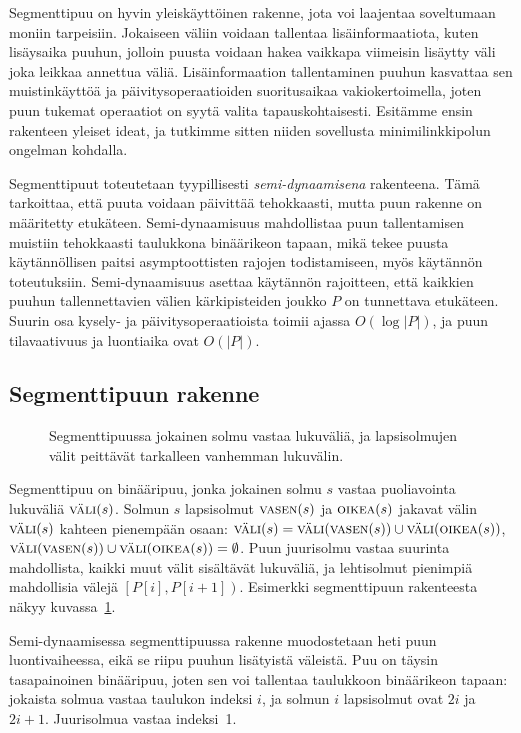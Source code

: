 \documentclass[finnish]{tktltiki2}
\theoremstyle{definition}
\theoremstyle{remark}
\newcommand\range[2]{\ensuremath{\left [ #1 , #2 \right )}\xspace}
\newcommand\size[1]{\ensuremath{\left |#1\right |}\xspace}
\newcommand\epts{\ensuremath{P}\xspace}
\newcommand\inter[1]{\ensuremath{\textsc{väli}(#1)}\xspace}
\newcommand\leftc[1]{\ensuremath{\textsc{vasen}(#1)}\xspace}
\newcommand\rightc[1]{\ensuremath{\textsc{oikea}(#1)}\xspace}
\begin{document}
Segmenttipuu on hyvin yleiskäyttöinen rakenne, jota voi laajentaa soveltumaan moniin tarpeisiin.
Jokaiseen väliin voidaan tallentaa lisäinformaatiota, kuten lisäysaika puuhun, jolloin puusta voidaan hakea vaikkapa viimeisin lisäytty väli joka leikkaa annettua väliä.
Lisäinformaation tallentaminen puuhun kasvattaa sen muistinkäyttöä ja päivitysoperaatioiden suoritusaikaa vakiokertoimella, joten puun tukemat operaatiot on syytä valita tapauskohtaisesti.
Esitämme ensin rakenteen yleiset ideat, ja tutkimme sitten niiden sovellusta minimilinkkipolun ongelman kohdalla.

Segmenttipuut toteutetaan tyypillisesti \emph{semi-dynaamisena} rakenteena.
Tämä tarkoittaa, että puuta voidaan päivittää tehokkaasti, mutta puun rakenne on määritetty etukäteen.
Semi-dynaamisuus mahdollistaa puun tallentamisen muistiin tehokkaasti taulukkona binäärikeon tapaan, mikä tekee puusta käytännöllisen paitsi asymptoottisten rajojen todistamiseen, myös käytännön toteutuksiin.
Semi-dynaamisuus asettaa käytännön rajoitteen, että kaikkien puuhun tallennettavien välien kärkipisteiden joukko \epts on tunnettava etukäteen.
Suurin osa kysely- ja päivitysoperaatioista toimii ajassa $O(\log \size{\epts})$, ja puun tilavaativuus ja luontiaika ovat $O(\size{\epts})$.

\subsection{Segmenttipuun rakenne}

\begin{figure}
\caption{Segmenttipuussa jokainen solmu vastaa lukuväliä, ja lapsisolmujen välit peittävät tarkalleen vanhemman lukuvälin.}\label{segpuu}
\end{figure}

Segmenttipuu on binääripuu, jonka jokainen solmu $s$ vastaa puoliavointa lukuväliä $\inter{s}$.
Solmun $s$ lapsisolmut $\leftc{s}$ ja $\rightc{s}$ jakavat välin $\inter{s}$ kahteen pienempään osaan: $\inter{s}=\inter{\leftc{s}}\cup\inter{\rightc{s}}$, $\inter{\leftc{s}}\cup\inter{\rightc{s}}=\emptyset$.
Puun juurisolmu vastaa suurinta mahdollista, kaikki muut välit sisältävät lukuväliä, ja lehtisolmut pienimpiä mahdollisia välejä $\range{\epts[i]}{\epts[i+1]}$.
Esimerkki segmenttipuun rakenteesta näkyy kuvassa~\ref{segpuu}.

Semi-dynaamisessa segmenttipuussa rakenne muodostetaan heti puun luontivaiheessa, eikä se riipu puuhun lisätyistä väleistä.
Puu on täysin tasapainoinen binääripuu, joten sen voi tallentaa taulukkoon binäärikeon tapaan: jokaista solmua vastaa taulukon indeksi $i$, ja solmun $i$ lapsisolmut ovat $2i$ ja $2i+1$.
Juurisolmua vastaa indeksi~1.
\end{document}
